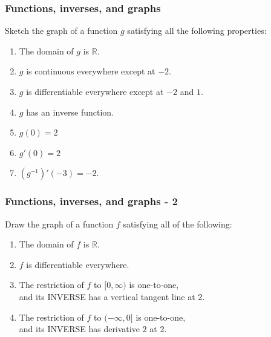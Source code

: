 \begin{frame}[t]
	\frametitle{Functions, inverses, and graphs }

	Sketch the graph of a function $g$ satisfying all the following properties:

	\begin{enumerate}
		\item The domain of $g$ is $\mathbb{R}$.

		\item $g$ is continuous everywhere except at $-2$.

		\item $g$ is differentiable everywhere except at $-2$ and $1$.

		\item $g$ has an inverse function.

		\item $g(0)=2$

		\item $g'(0) = 2$

		\item $\displaystyle \left(g^{-1}\right)' (-3) = -2$.
	\end{enumerate}
\end{frame}

\begin{frame}[t]
	\frametitle{Functions, inverses, and graphs - 2}

	Draw the graph of a function $f$ satisfying all of the following:

	\begin{enumerate}
		\item The domain of $f$ is $\mathbb{R}$.

		\item $f$ is differentiable everywhere.

		\item The restriction of $f$ to $\displaystyle [0, \infty)$ is one-to-one,
			\\ and its INVERSE has a vertical tangent line at $2$.

		\item The restriction of $f$ to $\displaystyle (- \infty,0]$ is one-to-one,
			\\ and its INVERSE has derivative $2$ at $2$.
	\end{enumerate}
\end{frame}

